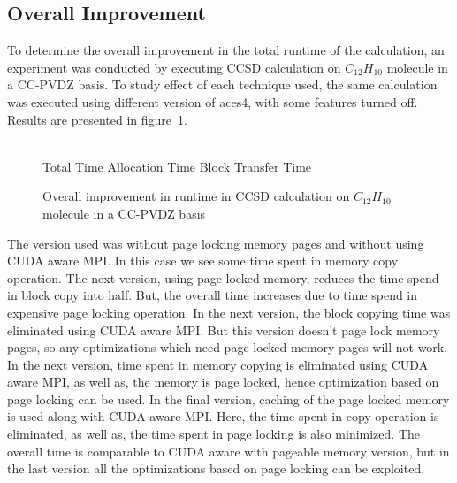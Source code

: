 \subsection{Overall Improvement}
To determine the overall improvement in the total runtime of the calculation, an
experiment was conducted by executing CCSD calculation on $C_{12}H_{10}$ molecule
in a CC-PVDZ basis. To study effect of each technique used, the same calculation
was executed using different version of aces4, with some features turned off. Results
are presented in figure~\ref{fig:gpu_real}.

\begin{figure}[h]
  
  \\
   Total Time
   Allocation Time
    Block Transfer Time
  \caption{Overall improvement in runtime in CCSD calculation on $C_{12}H_{10}$ molecule in a CC-PVDZ basis}
  \label{fig:gpu_real}
\end{figure}

The version used was without page locking memory pages and without using CUDA aware
MPI. In this case we see some time spent in memory copy operation. The next version,
using page locked memory, reduces the time spend in block copy into half. But, the
overall time increases due to time spend in expensive page locking operation. In
the next version, the block copying time was eliminated using CUDA aware MPI. But
this version doesn't page lock memory pages, so any optimizations which need page
locked memory pages will not work. In the next version, time spent in memory
copying is eliminated using CUDA aware MPI, as well as, the memory is page locked,
hence optimization based on page locking can be used. In the final version, caching
of the page locked memory is used along with CUDA aware MPI. Here, the time spent
in copy operation is eliminated, as well as, the time spent in page locking is
also minimized. The overall time is comparable to CUDA aware with pageable memory
version, but in the last version all the optimizations based on page locking can
be exploited.